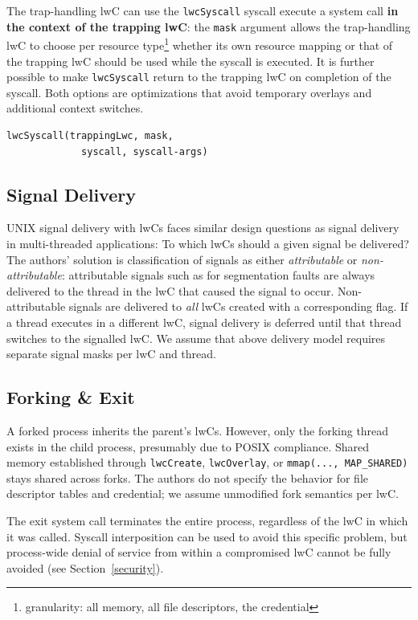 \documentclass[10pt,twocolumn,a4paper]{article}
\begin{document}
The trap-handling lwC can use the \lstinline{lwcSyscall} syscall execute a system call \textbf{in the context of the trapping lwC}:
the \lstinline{mask} argument allows the trap-handling lwC to choose per resource type\footnote{granularity: all memory, all file descriptors, the credential} whether its own resource mapping or that of the trapping lwC should be used while the syscall is executed.
It is further possible to make \lstinline{lwcSyscall} return to the trapping lwC on completion of the syscall.
Both options are optimizations that avoid temporary overlays and additional context switches.
\cite{lwcpaper,lwckernelrepo}

\begin{lstlisting}[style=syscallinline]
  lwcSyscall(trappingLwc, mask,
             syscall, syscall-args)
\end{lstlisting}

\subsection{Signal Delivery}
UNIX signal delivery with lwCs faces similar design questions as signal delivery in multi-threaded applications: To which lwCs should a given signal be delivered?
The authors' solution is classification of signals as either \textit{attributable} or \textit{non-attributable}:
attributable signals such as for segmentation faults are always delivered to the thread in the lwC that caused the signal to occur.
Non-attributable signals are delivered to \textit{all} lwCs created with a corresponding flag.
If a thread executes in a different lwC, signal delivery is deferred until that thread switches to the signalled lwC.
\cite{lwcpaper}
We assume that above delivery model requires separate signal masks per lwC and thread.

\subsection{Forking \& Exit}
A forked process inherits the parent's lwCs.
However, only the forking thread exists in the child process, presumably due to POSIX compliance\cite{forkmultithread}. %
Shared memory established through \lstinline{lwcCreate}, \lstinline{lwcOverlay}, or \lstinline{mmap(..., MAP_SHARED)} stays shared across forks.
The authors do not specify the behavior for file descriptor tables and credential; we assume unmodified fork semantics per lwC.
\cite{lwcpaper}

The exit system call terminates the entire process, regardless of the lwC in which it was called.
Syscall interposition can be used to avoid this specific problem, but process-wide denial of service from within a compromised lwC cannot be fully avoided (see Section~\ref{security}).
\cite{lwcpaper}
\end{document}
